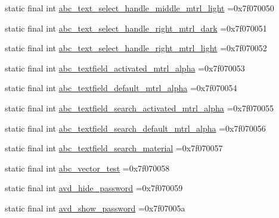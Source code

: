 \begin{DoxyCompactItemize}
\item 
static final int \mbox{\hyperlink{classbr_1_1unb_1_1cic_1_1mp_1_1marketmaster_1_1test_1_1R_1_1drawable_a75a461b8a0af340e08193e5eee4a30f4}{abc\+\_\+text\+\_\+select\+\_\+handle\+\_\+middle\+\_\+mtrl\+\_\+light}} =0x7f070050
\item 
static final int \mbox{\hyperlink{classbr_1_1unb_1_1cic_1_1mp_1_1marketmaster_1_1test_1_1R_1_1drawable_a25a460169a9a50730582f43cdf7ea2df}{abc\+\_\+text\+\_\+select\+\_\+handle\+\_\+right\+\_\+mtrl\+\_\+dark}} =0x7f070051
\item 
static final int \mbox{\hyperlink{classbr_1_1unb_1_1cic_1_1mp_1_1marketmaster_1_1test_1_1R_1_1drawable_ac33abca28280412d3bd81a949464118a}{abc\+\_\+text\+\_\+select\+\_\+handle\+\_\+right\+\_\+mtrl\+\_\+light}} =0x7f070052
\item 
static final int \mbox{\hyperlink{classbr_1_1unb_1_1cic_1_1mp_1_1marketmaster_1_1test_1_1R_1_1drawable_a99d700726c17b7c68c8a542f8b042873}{abc\+\_\+textfield\+\_\+activated\+\_\+mtrl\+\_\+alpha}} =0x7f070053
\item 
static final int \mbox{\hyperlink{classbr_1_1unb_1_1cic_1_1mp_1_1marketmaster_1_1test_1_1R_1_1drawable_ad721db0d2cab501af8f994547dfe6c27}{abc\+\_\+textfield\+\_\+default\+\_\+mtrl\+\_\+alpha}} =0x7f070054
\item 
static final int \mbox{\hyperlink{classbr_1_1unb_1_1cic_1_1mp_1_1marketmaster_1_1test_1_1R_1_1drawable_a0e2a90d98fc978277c1deba02d993cd7}{abc\+\_\+textfield\+\_\+search\+\_\+activated\+\_\+mtrl\+\_\+alpha}} =0x7f070055
\item 
static final int \mbox{\hyperlink{classbr_1_1unb_1_1cic_1_1mp_1_1marketmaster_1_1test_1_1R_1_1drawable_acc5e803a220798badf09282a6d69b442}{abc\+\_\+textfield\+\_\+search\+\_\+default\+\_\+mtrl\+\_\+alpha}} =0x7f070056
\item 
static final int \mbox{\hyperlink{classbr_1_1unb_1_1cic_1_1mp_1_1marketmaster_1_1test_1_1R_1_1drawable_ad5865f2c6b30ef9509131061dbd125a7}{abc\+\_\+textfield\+\_\+search\+\_\+material}} =0x7f070057
\item 
static final int \mbox{\hyperlink{classbr_1_1unb_1_1cic_1_1mp_1_1marketmaster_1_1test_1_1R_1_1drawable_a7c8163a111981ddf60df0ee4d1a3ce51}{abc\+\_\+vector\+\_\+test}} =0x7f070058
\item 
static final int \mbox{\hyperlink{classbr_1_1unb_1_1cic_1_1mp_1_1marketmaster_1_1test_1_1R_1_1drawable_ac2cf695c4b76386d197f80bd7bbc03b2}{avd\+\_\+hide\+\_\+password}} =0x7f070059
\item 
static final int \mbox{\hyperlink{classbr_1_1unb_1_1cic_1_1mp_1_1marketmaster_1_1test_1_1R_1_1drawable_a2f9d4c260238e5d157ba0c6cfc35a9b1}{avd\+\_\+show\+\_\+password}} =0x7f07005a

\end{DoxyCompactItemize}
